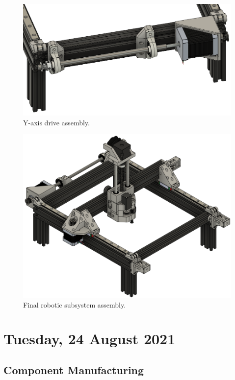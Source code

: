\begin{figure}[H]
	\centering
	\includegraphics[width=0.7\linewidth]{figures/202108/y-axis-drive-assembly.png}
	\caption{Y-axis drive assembly.}
	\label{fig:y-axis-drive-assembly}
\end{figure}

\begin{figure}[H]
	\centering
	\includegraphics[width=0.9\linewidth]{figures/202108/final-assembly.png}
	\caption{Final robotic subsystem assembly.}
	\label{fig:final-assembly}
\end{figure}

\pendsign

\section[2021/08/24]{Tuesday, 24 August 2021}

\subsection{Component Manufacturing}

